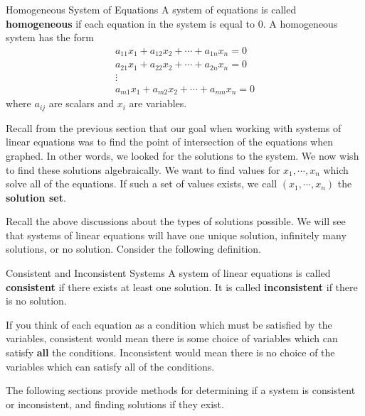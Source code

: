 \begin{definition}{Homogeneous System of Equations}\label{def:homogeneoussystem}
A system of equations is called \textbf{homogeneous}  if each equation in
the system  is equal to $0$. A homogeneous system has the form 
\begin{equation*}
\begin{array}{c}
a_{11}x_{1}+a_{12}x_{2}+\cdots +a_{1n}x_{n}= 0 \\
a_{21}x_{1}+a_{22}x_{2}+\cdots +a_{2n}x_{n}= 0  \\
\vdots \\
a_{m1}x_{1}+a_{m2}x_{2}+\cdots +a_{mn}x_{n}= 0 
\end{array}
\end{equation*}
where $a_{ij}$ are scalars and $x_{i}$ are variables.
\end{definition}

Recall from the previous section that our goal when working with systems of linear equations 
was to find the point of intersection of the equations when graphed. In other words, we 
looked for the solutions to the system. We now wish to find these solutions algebraically. We want to find values for  
$ x_{1},\cdots ,x_{n} $ which solve all of
the equations. If such a set of values exists,  we call $\left( x_{1},\cdots ,x_{n}\right)$  the \textbf{solution set}.  

Recall the above discussions about the types of solutions possible. 
We will see that systems of linear equations will have one unique solution, infinitely many solutions, 
or no solution.  Consider the following definition. 

\begin{definition}{Consistent and Inconsistent Systems}\label{def:consistentandinconsistent}
A system of linear equations is called
 \textbf{consistent} if there exists at least one solution. It is
called
 \textbf{inconsistent }if there is no solution.
\end{definition}

If you think of each equation as a condition which must
be satisfied by the variables, consistent would mean there is some choice of
variables which can satisfy \textbf{all} the conditions. Inconsistent would mean
there is no choice of the variables which can satisfy all of the conditions.

The following sections provide methods for determining if a system is consistent or inconsistent, and finding
solutions if they exist.